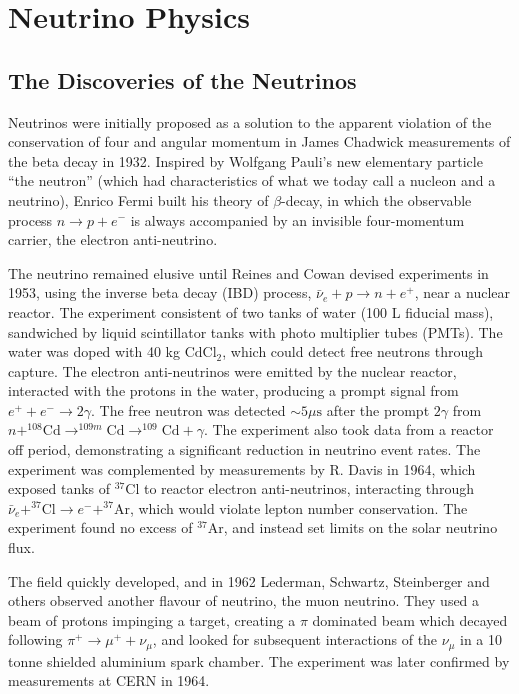 \chapter{Neutrino Physics}
\label{chap:theory}
\section{The Discoveries of the Neutrinos}
Neutrinos were initially proposed as a solution to the apparent violation of the conservation of four and angular momentum in James Chadwick measurements of the beta decay in 1932\cite{Chadwick1,Chadwick2}. Inspired by Wolfgang Pauli's new elementary particle ``the neutron'' (which had characteristics of what we today call a nucleon and a neutrino)\cite{pauli_1933}, Enrico Fermi built his theory of $\beta$-decay\cite{fermi_1934}, in which the observable process $n \rightarrow p + e^-$ is always accompanied by an invisible four-momentum carrier, the electron anti-neutrino.

The neutrino remained elusive until Reines and Cowan devised experiments\cite{reines_cowan_1,reines_cowan_2} in 1953, using the inverse beta decay (IBD) process, $\bar{\nu}_e + p \rightarrow n + e^+$, near a nuclear reactor. The experiment consistent of two tanks of water (100 L fiducial mass), sandwiched by liquid scintillator tanks with photo multiplier tubes (PMTs). The water was doped with 40 kg $\text{CdCl}_2$, which could detect free neutrons through capture. The electron anti-neutrinos were emitted by the nuclear reactor, interacted with the protons in the water, producing a prompt signal from $e^+ + e^- \rightarrow 2\gamma$. The free neutron was detected $\sim5\mu\text{s}$ after the prompt $2\gamma$ from $n + ^{108}\text{Cd} \rightarrow ^{109m}\text{Cd} \rightarrow ^{109}\text{Cd} + \gamma$. The experiment also took data from a reactor off period, demonstrating a significant reduction in neutrino event rates. The experiment was complemented by measurements by R. Davis\cite{davis} in 1964, which exposed tanks of $^{37}\text{Cl}$ to reactor electron anti-neutrinos, interacting through $\bar{\nu}_e + ^{37}\text{Cl} \rightarrow e^- + ^{37}\text{Ar}$, which would violate lepton number conservation. The experiment found no excess of $^{37}\text{Ar}$, and instead set limits on the solar neutrino flux.

The field quickly developed, and in 1962 Lederman, Schwartz, Steinberger and others\cite{lederman} observed another flavour of neutrino, the muon neutrino. They used a beam of protons impinging a target, creating a $\pi$ dominated beam which decayed following $\pi^+ \rightarrow \mu^+ + \nu_\mu$, and looked for subsequent interactions of the $\nu_\mu$ in a 10 tonne shielded aluminium spark chamber. The experiment was later confirmed by measurements at CERN in 1964\cite{cern_spark,cern_spark2}.

